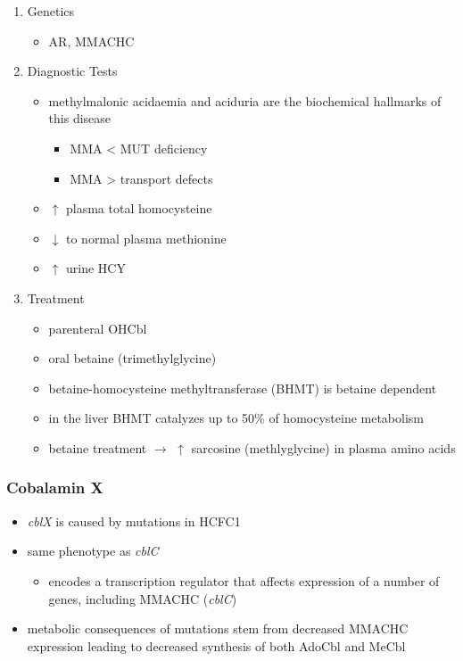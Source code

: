 \documentclass{scrartcl}
\begin{document}
\begin{enumerate}
\item Genetics
\label{sec:orgbb2b89c}
\begin{itemize}
\item AR, MMACHC
\end{itemize}

\item Diagnostic Tests
\label{sec:orgd596dac}
\begin{itemize}
\item methylmalonic acidaemia and aciduria are the
biochemical hallmarks of this disease
\begin{itemize}
\item MMA \textless{} MUT deficiency
\item MMA \textgreater{} transport defects
\end{itemize}
\item \(\uparrow\) plasma total homocysteine
\item \(\downarrow\) to normal plasma methionine
\item \(\uparrow\) urine HCY
\end{itemize}

\item Treatment
\label{sec:orgdf9b1b0}
\begin{itemize}
\item parenteral OHCbl
\item oral betaine (trimethylglycine)
\item betaine-homocysteine methyltransferase (BHMT) is betaine dependent
\end{itemize}
\begin{itemize}
\item in the liver BHMT catalyzes up to 50\% of homocysteine metabolism
\item betaine treatment \(\to\) \(\uparrow\) sarcosine (methlyglycine) in plasma amino acids
\end{itemize}
\end{enumerate}

\subsubsection{Cobalamin X}
\label{sec:org7615005}
\begin{itemize}
\item \emph{cblX} is caused by mutations in HCFC1
\item same phenotype as \emph{cblC}
\begin{itemize}
\item encodes a transcription regulator that affects expression of a
number of genes, including MMACHC (\emph{cblC})
\end{itemize}
\item metabolic consequences of mutations stem from decreased MMACHC
expression leading to decreased synthesis of both AdoCbl and MeCbl
\end{itemize}
\end{document}
